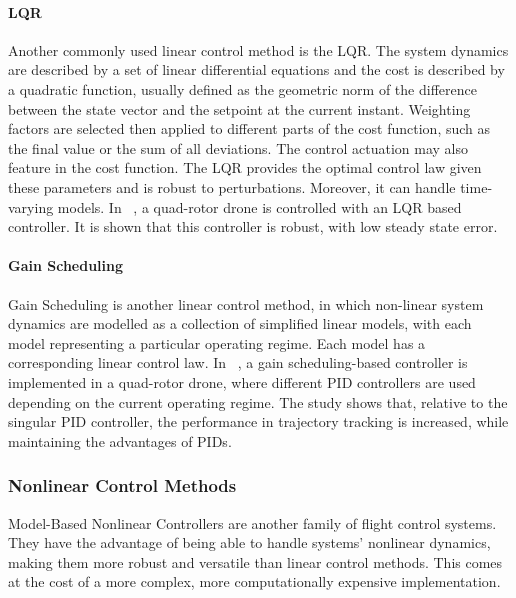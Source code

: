 \paragraph*{LQR}
Another commonly used linear control method is the \gls{LQR}. The system dynamics are described by a set of linear differential equations and the cost is described by a quadratic function, usually defined as the geometric norm of the difference between the state vector and the setpoint at the current instant. Weighting factors are selected then applied to different parts of the cost function, such as the final value or the sum of all deviations. The control actuation may also feature in the cost function. The LQR provides the optimal control law given these parameters and is robust to perturbations. Moreover, it can handle time-varying models. In ~\cite{ShahidaK}, a quad-rotor drone is controlled with an LQR based controller. It is shown that this controller is robust, with low steady state error.

\paragraph*{Gain Scheduling}
Gain Scheduling is another linear control method, in which non-linear system dynamics are modelled as a collection of simplified linear models, with each model representing a particular operating regime. Each model has a corresponding linear control law. In ~\cite{JingQ}, a gain scheduling-based controller is implemented in a quad-rotor drone, where different PID controllers are used depending on the current operating regime. The study shows that, relative to the singular PID controller, the performance in trajectory tracking is increased, while maintaining the advantages of PIDs. \\

\subsubsection{Nonlinear Control Methods}

Model-Based Nonlinear Controllers are another family of flight control systems. They have the advantage of being able to handle systems'  nonlinear dynamics, making them more robust and versatile than linear control methods. This comes at the cost of a more complex, more computationally expensive implementation.

